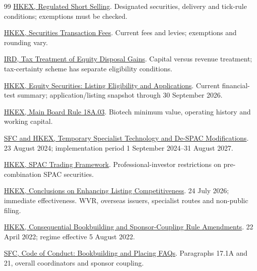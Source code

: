 \documentclass[11pt,a4paper]{article}
\begin{document}
\begin{thebibliography}{99}
 \href{https://www.hkex.com.hk/services/trading/securities/overview/regulated-short-selling?sc_lang=en}{HKEX, Regulated Short Selling}. Designated securities, delivery and tick-rule conditions; exemptions must be checked.

 \href{https://www.hkex.com.hk/Services/Rules-and-Forms-and-Fees/Fees/Securities-(Hong-Kong)/Trading/Transaction?sc_lang=en}{HKEX, Securities Transaction Fees}. Current fees and levies; exemptions and rounding vary.

 \href{https://www.ird.gov.hk/eng/tax/bus_taxcertainty.htm}{IRD, Tax Treatment of Equity Disposal Gains}. Capital versus revenue treatment; tax-certainty scheme has separate eligibility conditions.

 \href{https://www.hkex.com.hk/Listing/Explore-By-Role/Potential-Applicants/Equity-Securities?sc_lang=en}{HKEX, Equity Securities: Listing Eligibility and Applications}. Current financial-test summary; application/listing snapshot through 30 September 2026.

 \href{https://en-rules.hkex.com.hk/rulebook/18a03-0}{HKEX, Main Board Rule 18A.03}. Biotech minimum value, operating history and working capital.

 \href{https://www.hkex.com.hk/News/Regulatory-Announcements/2024/240823news?sc_lang=en}{SFC and HKEX, Temporary Specialist Technology and De-SPAC Modifications}. 23 August 2024; implementation period 1 September 2024--31 August 2027.

 \href{https://www.hkex.com.hk/Services/Trading/Securities/Overview/Trading-Mechanism/SPAC?sc_lang=en}{HKEX, SPAC Trading Framework}. Professional-investor restrictions on pre-combination SPAC securities.

 \href{https://www.hkex.com.hk/News/Regulatory-Announcements/2026/260724news?sc_lang=en}{HKEX, Conclusions on Enhancing Listing Competitiveness}. 24 July 2026; immediate effectiveness. WVR, overseas issuers, specialist routes and non-public filing.

 \href{https://www.hkex.com.hk/News/Regulatory-Announcements/2022/220422news?sc_lang=en}{HKEX, Consequential Bookbuilding and Sponsor-Coupling Rule Amendments}. 22 April 2022; regime effective 5 August 2022.

 \href{https://www.sfc.hk/en/faqs/intermediaries/supervision/Code-of-Conduct/6-May-2022---Code-of-Conduct}{SFC, Code of Conduct: Bookbuilding and Placing FAQs}. Paragraphs 17.1A and 21, overall coordinators and sponsor coupling.


\end{thebibliography}
\end{document}
